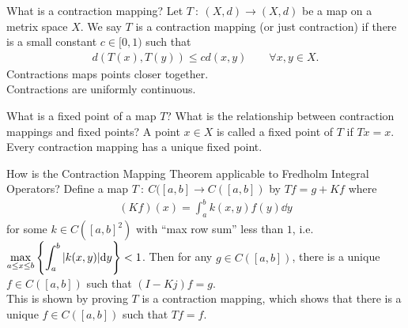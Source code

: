 \documentclass[avery5388,grid,frame]{flashcards}
\newcommand{\f}[3]{#1\ :\ #2 \rightarrow #3}
\begin{document}


\begin{flashcard}
    {What is a contraction mapping?}
    Let $\f{T}{(X,d)}{(X,d)}$ be a map on a metrix space $X$.  We say $T$ is a contraction mapping (or just contraction) if there is a small constant $c \in [0,1)$ such that
    \begin{align*}
        d(T(x),T(y)) \leq c d(x,y) \qquad \forall x,y \in X.
    \end{align*}
    Contractions maps points closer together. \\

    Contractions are uniformly continuous.
\end{flashcard}

\begin{flashcard}
    {What is a fixed point of a map $T$?  What is the relationship between contraction mappings and fixed points?}
    A point $x \in X$ is called a fixed point of $T$ if $Tx = x$. \\

    Every contraction mapping has a unique fixed point.
\end{flashcard}

\begin{flashcard}
    {How is the Contraction Mapping Theorem applicable to Fredholm Integral Operators?}
    Define a map $\f{T}{C([a,b]}{C([a,b]})$ by $Tf = g + Kf$ where
    \begin{align*}
        (Kf)(x) = \int_a^b k(x,y)f(y)\dd y
    \end{align*}
    for some $k \in C([a,b]^2)$ with ``max row sum'' less than $1$, i.e. $\displaystyle\max_{a\leq x\leq b}\left\{\int_a^b\abs{k(x,y)}\dd y\right\} < 1$.  Then for any $g \in C([a,b])$, there is a unique $f \in C([a,b])$ such that $(I - Kj)f = g$. \\

    This is shown by proving $T$ is a contraction mapping, which shows that there is a unique $f \in C([a,b])$ such that $Tf = f$.
\end{flashcard}
\end{document}

